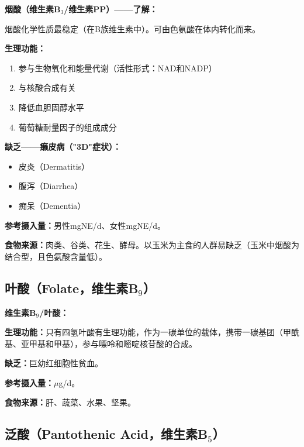 \begin{tipbox}
\textbf{烟酸（维生素B$_3$/维生素PP）——了解：}

烟酸化学性质最稳定（在B族维生素中）。可由色氨酸在体内转化而来。

\textbf{生理功能：}
\begin{enumerate}[leftmargin=*]
    \item 参与生物氧化和能量代谢（活性形式：NAD和NADP）
    \item 与核酸合成有关
    \item 降低血胆固醇水平
    \item 葡萄糖耐量因子的组成成分
\end{enumerate}

\textbf{缺乏——癞皮病（"3D"症状）：}
\begin{itemize}[leftmargin=*]
    \item 皮炎（Dermatitis）
    \item 腹泻（Diarrhea）
    \item 痴呆（Dementia）
\end{itemize}

\textbf{参考摄入量：}男性mgNE/d、女性mgNE/d。

\textbf{食物来源：}肉类、谷类、花生、酵母。以玉米为主食的人群易缺乏（玉米中烟酸为结合型，且色氨酸含量低）。%
\end{tipbox}

\subsection{叶酸（Folate，维生素B$_9$）}

\begin{keybox}
\textbf{维生素B$_9$/叶酸：}

\textbf{生理功能：}只有四氢叶酸有生理功能，作为一碳单位的载体，携带一碳基团（甲酰基、亚甲基和甲基），参与嘌呤和嘧啶核苷酸的合成。

\textbf{缺乏：}巨幼红细胞性贫血。

\textbf{参考摄入量：}$\mu$g/d。

\textbf{食物来源：}肝、蔬菜、水果、坚果。
\end{keybox}

\subsection{泛酸（Pantothenic Acid，维生素B$_5$）}

